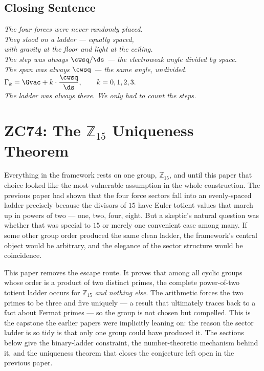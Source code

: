 \documentclass[12pt, a4paper]{article}
\begin{document}
\subsection{Closing Sentence}

\bigskip
\begin{center}
\textit{%
  The four forces were never randomly placed.\\
  They stood on a ladder --- equally spaced,\\
  with gravity at the floor and light at the ceiling.\\[0.5em]
  The step was always $\cwsq/\ds$ --- the electroweak
  angle divided by space.\\
  The span was always $\cwsq$ --- the same angle,
  undivided.\\[0.5em]
  $\displaystyle
    \Gamma_k = \Gvac + k\cdot\frac{\cwsq}{\ds},
    \qquad k = 0,1,2,3.
  $\\[0.5em]
  \textit{The ladder was always there. We only had to count the steps.}
}
\end{center}



\section{ZC74: The $\mathbb{Z}_{15}$ Uniqueness Theorem}

Everything in the framework rests on one group, $\mathbb{Z}_{15}$, and until
this paper that choice looked like the most vulnerable assumption in the whole
construction. The previous paper had shown that the four force sectors fall
into an evenly-spaced ladder precisely because the divisors of $15$ have Euler
totient values that march up in powers of two --- one, two, four, eight. But a
skeptic's natural question was whether that was special to $15$ or merely one
convenient case among many. If some other group order produced the same clean
ladder, the framework's central object would be arbitrary, and the elegance of
the sector structure would be coincidence.

This paper removes the escape route. It proves that among all cyclic groups
whose order is a product of two distinct primes, the complete power-of-two
totient ladder occurs for $\mathbb{Z}_{15}$ \emph{and nothing else}. The
arithmetic forces the two primes to be three and five uniquely --- a result
that ultimately traces back to a fact about Fermat primes --- so the group is
not chosen but compelled. This is the capstone the earlier papers were
implicitly leaning on: the reason the sector ladder is so tidy is that only
one group could have produced it. The sections below give the binary-ladder
constraint, the number-theoretic mechanism behind it, and the uniqueness
theorem that closes the conjecture left open in the previous paper.
\label{sec:zc74}
\end{document}
